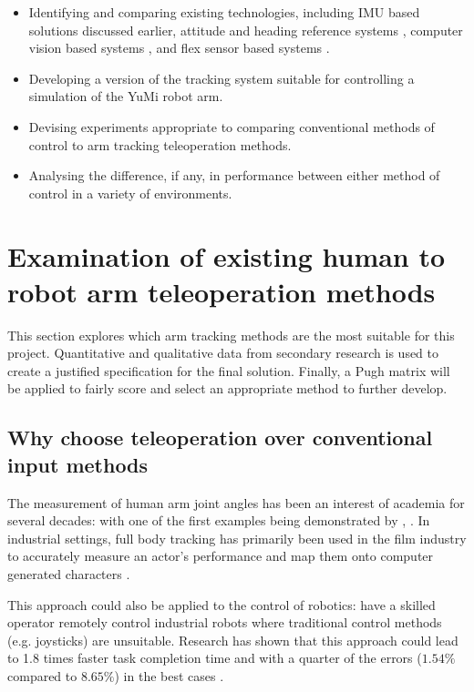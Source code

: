   \begin{itemize}
    \item Identifying and comparing existing technologies, including IMU based solutions discussed earlier, attitude and heading reference systems \cite{ref:Mazomenos_Biswas_Cranny_Rajan_Maharatna_Achner_Klemke_Jobges_Ortmann_Langendorfer_2016}, computer vision based systems \cite{ref:Phuong_Cong_2024}, and flex sensor based systems \cite{ref:Nalam_Manivannan_2014}.
    \item Developing a version of the tracking system suitable for controlling a simulation of the YuMi robot arm.
    \item Devising experiments appropriate to comparing conventional methods of control to arm tracking teleoperation methods.
    \item Analysing the difference, if any, in performance between either method of control in a variety of environments.
  \end{itemize}

\section{Examination of existing human to robot arm teleoperation methods}

  This section explores which arm tracking methods are the most suitable for this project.
  Quantitative and qualitative data from secondary research is used to create a justified specification for the final solution.
  Finally, a Pugh matrix will be applied to fairly score and select an appropriate method to further develop.

\label{sec:litrev}

  \subsection{Why choose teleoperation over conventional input methods}
    The measurement of human arm joint angles has been an interest of academia for several decades: with one of the first examples being demonstrated by \citeauthor{ref:videobasedumanmotioncapture}, \cite{ref:videobasedumanmotioncapture}. 
    In industrial settings, full body tracking has primarily been used in the film industry to accurately measure an actor's performance \cite{ref:mocapwhy} and map them onto computer generated characters \cite{ref:whatmocap}.
    
    This approach could also be applied to the control of robotics: have a skilled operator remotely control industrial robots where traditional control methods (e.g. joysticks) are unsuitable.
    Research has shown that this approach could lead to \num{1.8} times faster task completion time and with a quarter of the errors (\(1.54 \% \) compared to \(8.65 \% \)) in the best cases  \cite{ref:vranalysis}. 

